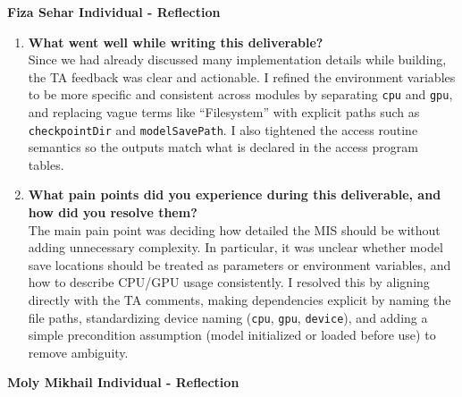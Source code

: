 \documentclass[12pt, titlepage]{article}
\begin{document}
\textbf{Fiza Sehar Individual - Reflection}

\begin{enumerate}
  \item \textbf{What went well while writing this deliverable?}\\
  Since we had already discussed many implementation details while building, the TA feedback was clear and actionable. I refined the environment variables to be more specific and consistent across modules by separating \texttt{cpu} and \texttt{gpu}, and replacing vague terms like ``Filesystem'' with explicit paths such as \texttt{checkpointDir} and \texttt{modelSavePath}. I also tightened the access routine semantics so the outputs match what is declared in the access program tables.

  \item \textbf{What pain points did you experience during this deliverable, and how did you resolve them?}\\
  The main pain point was deciding how detailed the MIS should be without adding unnecessary complexity. In particular, it was unclear whether model save locations should be treated as parameters or environment variables, and how to describe CPU/GPU usage consistently. I resolved this by aligning directly with the TA comments, making dependencies explicit by naming the file paths, standardizing device naming (\texttt{cpu}, \texttt{gpu}, \texttt{device}), and adding a simple precondition assumption (model initialized or loaded before use) to remove ambiguity.
\end{enumerate}


\textbf{Moly Mikhail Individual - Reflection}
\end{document}
